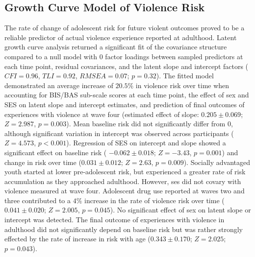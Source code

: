 \documentclass[utf8]{frontiersSCNS} %
\begin{document}
\subsection{Growth Curve Model of Violence Risk} The rate of change of adolescent risk for future violent outcomes proved to be a reliable predictor of actual violence experience reported at adulthood. Latent growth curve analysis returned a significant fit of the covariance structure compared to a null model with 0 factor loadings between sampled predictors at each time point, residual covariances, and the latent slope and intercept factors ($CFI = 0.96$, $TLI = 0.92$, $RMSEA = 0.07$; $p = 0.32$). The fitted model demonstrated an average increase of $20.5\%$ in violence risk over time when accounting for BIS/BAS sub-scale scores at each time point, the effect of sex and SES on latent slope and intercept estimates, and prediction of final outcomes of experiences with violence at wave four (estimated effect of slope: $0.205\pm0.069$; $Z=2.987$, $p=0.003$). Mean baseline risk did not significantly differ from $0$, although significant variation in intercept was observed across participants ($Z=4.573$, $p<0.001$). Regression of SES on intercept and slope showed a significant effect on baseline risk ( $-0.062\pm0.018$; $Z=-3.43$, $p=0.001$) and change in risk over time ($0.031\pm0.012$; $Z=2.63$, $p=0.009$). Socially advantaged youth started at lower pre-adolescent risk, but experienced a greater rate of risk accumulation as they approached adulthood. However, ses did not covary with violence measured at wave four. Adolescent drug use reported at waves two and three contributed to a $4\%$ increase in the rate of violence risk over time ($0.041\pm0.020$; $Z=2.005$, $p=0.045$). No significant effect of sex on latent slope or intercept was detected. The final outcome of experiences with violence in adulthood did not significantly depend on baseline risk but was rather strongly effected by the rate of increase in risk with age ($0.343\pm0.170$; $Z=2.025$; $p=0.043$). 
\end{document}
